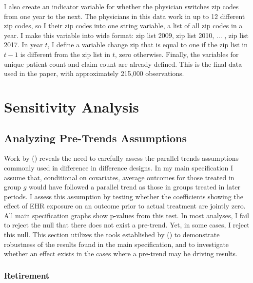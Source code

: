 \documentclass[12pt]{article}
\begin{document}
I also create an indicator variable for whether the physician switches zip codes from one year to the next. The physicians in this data work in up to 12 different zip codes, so I their zip codes into one string variable, a list of all zip codes in a year. I make this variable into wide format: zip list 2009, zip list 2010, ... , zip list 2017.  In year $t$, I define a variable change zip that is equal to one if the zip list in $t-1$ is different from the zip list in $t$, zero otherwise. Finally, the variables for unique patient count and claim count are already defined. This is the final data used in the paper, with approximately 215,000 observations. 



\section{Sensitivity Analysis}

\subsection{Analyzing Pre-Trends Assumptions}\label{sec:pretrends}

Work by \citeauthor{rambachan2019honest} (\citeyear{rambachan2019honest}) reveals the need to carefully assess the parallel trends assumptions commonly used in difference in difference designs. In my main specification I assume that, conditional on covariates, average outcomes for those treated in group $g$ would have followed a parallel trend as those in groups treated in later periods. I assess this assumption by testing whether the coefficients showing the effect of EHR exposure on an outcome prior to actual treatment are jointly zero. All main specification graphs show p-values from this test. In most analyses, I fail to reject the null that there does not exist a pre-trend. Yet, in some cases, I reject this null. This section utilizes the tools established by \citeauthor{rambachan2019honest} (\citeyear{rambachan2019honest}) to demonstrate robustness of the results found in the main specification, and to investigate whether an effect exists in the cases where a pre-trend may be driving results. 

\subsubsection{Retirement} 
\end{document}
